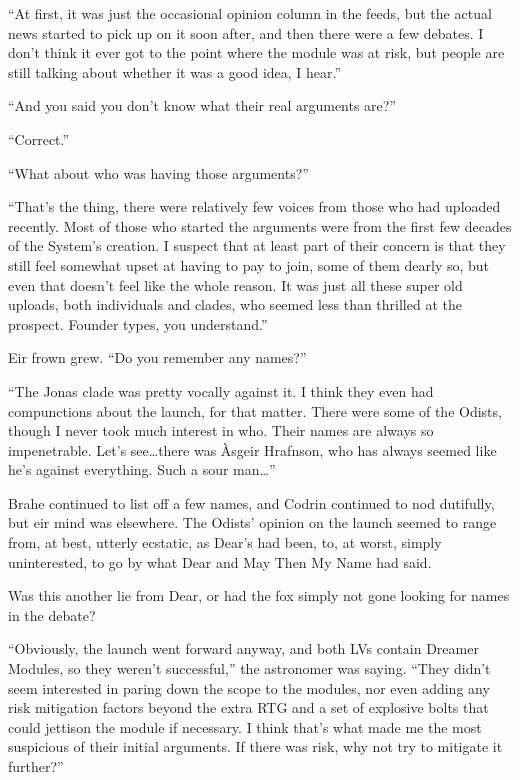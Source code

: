 ``At first, it was just the occasional opinion column in the feeds, but the actual news started to pick up on it soon after, and then there were a few debates. I don't think it ever got to the point where the module was at risk, but people are still talking about whether it was a good idea, I hear.''

``And you said you don't know what their real arguments are?''

``Correct.''

``What about who was having those arguments?''

``That's the thing, there were relatively few voices from those who had uploaded recently. Most of those who started the arguments were from the first few decades of the System's creation. I suspect that at least part of their concern is that they still feel somewhat upset at having to pay to join, some of them dearly so, but even that doesn't feel like the whole reason. It was just all these super old uploads, both individuals and clades, who seemed less than thrilled at the prospect. Founder types, you understand.''

Eir frown grew. ``Do you remember any names?''

``The Jonas clade was pretty vocally against it. I think they even had compunctions about the launch, for that matter. There were some of the Odists, though I never took much interest in who. Their names are always so impenetrable. Let's see\ldots there was Àsgeir Hrafnson, who has always seemed like he's against everything. Such a sour man\ldots{}''

Brahe continued to list off a few names, and Codrin continued to nod dutifully, but eir mind was elsewhere. The Odists' opinion on the launch seemed to range from, at best, utterly ecstatic, as Dear's had been, to, at worst, simply uninterested, to go by what Dear and May Then My Name had said.

Was this another lie from Dear, or had the fox simply not gone looking for names in the debate?

``Obviously, the launch went forward anyway, and both LVs contain Dreamer Modules, so they weren't successful,'' the astronomer was saying. ``They didn't seem interested in paring down the scope to the modules, nor even adding any risk mitigation factors beyond the extra RTG and a set of explosive bolts that could jettison the module if necessary. I think that's what made me the most suspicious of their initial arguments. If there was risk, why not try to mitigate it further?''


